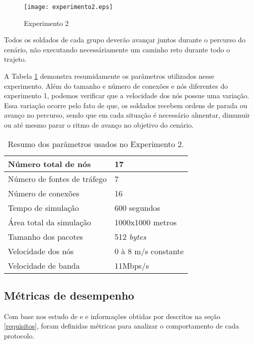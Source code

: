 \begin{figure}[H]
	\centering
	\texttt{[image: experimento2.eps]}
	\caption{Experimento 2}
	\label{figExp2}
\end{figure}

Todos os soldados de cada grupo dever\~ao avan\c{c}ar juntos durante o percurso do cen\'ario, n\~ao executando necess\'ariamente um caminho reto durante todo o trajeto.

A Tabela \ref{tabParamExp2} demonstra resumidamente os par\^ametros utilizados nesse experimento. 
Al\'em do tamanho e n\'umero de conex\~oes e n\'os diferentes do experimento 1, podemos verificar que a velocidade dos n\'os possue uma varia\c{c}\~ao.
Essa varia\c{c}\~ao ocorre pelo fato de que, os soldados recebem ordens de parada ou avan\c{c}o no percurso, sendo que em cada situa\c{c}\~ao \'e necess\'ario almentar, dimunuir ou at\'e mesmo parar o ritmo de avan\c{c}o no objetivo do cen\'ario.

\begin{table}[H]
	\centering
	\caption{Resumo dos par\^ametros usados no Experimento 2.}
	\begin{tabular}{ | l | l | }
		\hline
		N\'umero total de n\'os & 17 \\ \hline
		N\'umero de fontes de tr\'afego & 7 \\ \hline
		N\'umero de conex\~oes & 16 \\ \hline
		Tempo de simula\c{c}\~ao & 600 segundos \\ \hline
		\'Area total da simula\c{c}\~ao & 1000x1000 metros \\ \hline
		Tamanho dos pacotes & 512 \textit{bytes} \\ \hline
		Velocidade dos n\'os & 0 \`a 8 m/s constante \\ \hline
		Velocidade de banda & 11Mbps/s \\ \hline
	\end{tabular}
	\label{tabParamExp2}
\end{table}


\subsection{M\'etricas de desempenho}
Com base nos estudo de \cite{pereira} e \cite{schimidt} e informa\c{c}\~oes obtidas por \cite{salles} descritos na se\c{c}\~ao \ref{requisitos}, foram definidas m\'etricas para analizar o comportamento de cada protocolo.

